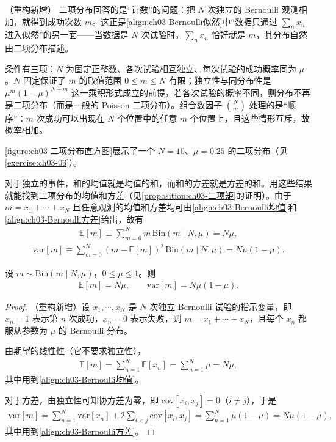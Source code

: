 \documentclass[../../main.tex]{subfiles}
\begin{document}
\begin{remark}（重构新增）
二项分布回答的是“计数”的问题：把 $N$ 次独立的 Bernoulli 观测相加，就得到成功次数 $m$。这正是\cref{align:ch03-Bernoulli似然}中“数据只通过 $\sum_n x_n$ 进入似然”的另一面——当数据是 $N$ 次试验时，$\sum_n x_n$ 恰好就是 $m$，其分布自然由二项分布描述。

条件有三项：$N$ 为固定正整数、各次试验相互独立、每次试验的成功概率同为 $\mu$。$N$ 固定保证了 $m$ 的取值范围 $0\leqslant m\leqslant N$ 有限；独立性与同分布性是 $\mu^{m}(1-\mu)^{N-m}$ 这一乘积形式成立的前提，若各次试验的概率不同，则分布不再是二项分布（而是一般的 Poisson 二项分布）。组合数因子 $\binom{N}{m}$ 处理的是“顺序”：$m$ 次成功可以出现在 $N$ 个位置中的任意 $m$ 个位置上，且这些情形互斥，故概率相加。
\end{remark}

\cref{figure:ch03-二项分布直方图}展示了一个 $N=10$、$\mu=0.25$ 的二项分布（见\cref{exercise:ch03-03}）。

对于独立的事件，和的均值就是均值的和，而和的方差就是方差的和。用这些结果就能找到二项分布的均值和方差（见\cref{proposition:ch03-二项矩}的证明）。由于 $m=x_1+\cdots+x_N$ 且任意观测的均值和方差均可由\cref{align:ch03-Bernoulli均值}和\cref{align:ch03-Bernoulli方差}给出，故有
\begin{align}
\mathbb{E}[m]\equiv\sum_{m=0}^{N}m\,\mathrm{Bin}(m\mid N,\mu)=N\mu,
\label{align:ch03-二项均值}
\end{align}
\begin{align}
\mathrm{var}[m]\equiv\sum_{m=0}^{N}(m-\mathbb{E}[m])^{2}\,\mathrm{Bin}(m\mid N,\mu)=N\mu(1-\mu).
\label{align:ch03-二项方差}
\end{align}

\begin{proposition}[二项分布的均值与方差]\label{proposition:ch03-二项矩}
设 $m\sim\mathrm{Bin}(m\mid N,\mu)$，$0\leqslant\mu\leqslant1$。则
\begin{align*}
\mathbb{E}[m]=N\mu,\qquad \mathrm{var}[m]=N\mu(1-\mu).
\end{align*}
\end{proposition}
\begin{proof}
（重构新增）设 $x_1,\cdots,x_N$ 是 $N$ 次独立 Bernoulli 试验的指示变量，即 $x_n=1$ 表示第 $n$ 次成功，$x_n=0$ 表示失败，则 $m=x_1+\cdots+x_N$，且每个 $x_n$ 都服从参数为 $\mu$ 的 Bernoulli 分布。

由期望的线性性（它不要求独立性），
\begin{align*}
\mathbb{E}[m]=\sum_{n=1}^{N}\mathbb{E}[x_n]=\sum_{n=1}^{N}\mu=N\mu,
\end{align*}
其中用到\eqref{align:ch03-Bernoulli均值}。

对于方差，由独立性可知协方差为零，即 $\mathrm{cov}[x_i,x_j]=0$（$i\neq j$），于是
\begin{align*}
\mathrm{var}[m]=\sum_{n=1}^{N}\mathrm{var}[x_n]+2\sum_{i<j}\mathrm{cov}[x_i,x_j]=\sum_{n=1}^{N}\mu(1-\mu)=N\mu(1-\mu),
\end{align*}
其中用到\eqref{align:ch03-Bernoulli方差}。
\end{proof}
\end{document}
